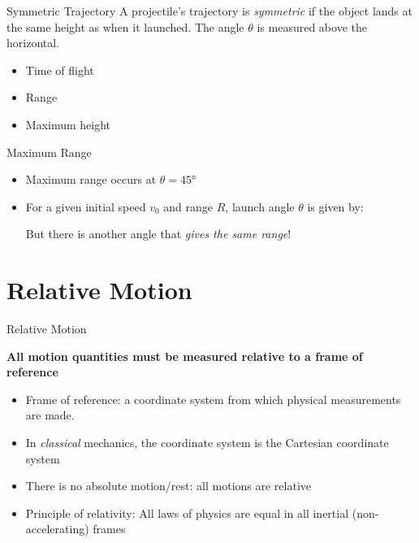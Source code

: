 \documentclass[12pt,compress,aspectratio=169]{beamer}
\begin{document}
\begin{frame}{Symmetric Trajectory}
  A projectile's trajectory is \emph{symmetric} if the object lands at the same
  height as when it launched. The angle $\theta$ is measured above the
  horizontal.
  \begin{itemize}
  \item Time of flight
  \item Range
  \item Maximum height
  \end{itemize}
\end{frame}



\begin{frame}{Maximum Range}
  
  \begin{itemize}
  \item Maximum range occurs at $\theta=\ang{45}$
  \item For a given initial speed $v_0$ and range $R$, launch angle $\theta$ is
    given by:
    

    But there is another angle that \emph{gives the same range}!

  \end{itemize}
\end{frame}


\section{Relative Motion}

\begin{frame}{Relative Motion}
  
  \begin{block}{}
    \textbf{All motion quantities must be measured relative to a frame of
      reference}
  \end{block}

  \vspace{.2in}
  \begin{itemize}
  \item Frame of reference: a coordinate system from which physical
    measurements are made.
  \item In \emph{classical} mechanics, the coordinate system is the
    Cartesian coordinate system
  \item There is no absolute motion/rest: all motions are relative
  \item Principle of relativity: All laws of physics are equal in all inertial
    (non-accelerating) frames
  \end{itemize}
\end{frame}  
\end{document}
